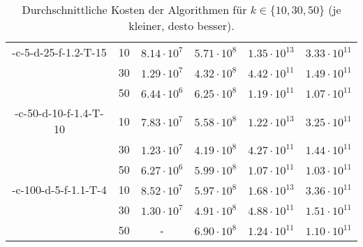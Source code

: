 \begin{table}[h]
\begin{tabular}{@{}cccccc@{}}
	\KCsTwo-c-5-d-25-f-1.2-T-15	& 10 & $8.14 \cdot 10^7$ & $5.71 \cdot 10^8$ & $1.35 \cdot 10^{13}$ & $3.33 \cdot 10^{11}$ \\
			 					& 30 & $1.29 \cdot 10^7$ & $4.32 \cdot 10^8$ & $4.42 \cdot 10^{11}$ & $1.49 \cdot 10^{11}$ \\
		 						& 50 & $6.44 \cdot 10^6$ & $6.25 \cdot 10^8$ & $1.19 \cdot 10^{11}$ & $1.07 \cdot 10^{11}$ \\
	\midrule
	\KCsTwo-c-50-d-10-f-1.4-T-10& 10 & $7.83 \cdot 10^7$ & $5.58 \cdot 10^8$ & $1.22 \cdot 10^{13}$ & $3.25 \cdot 10^{11}$ \\
			 					& 30 & $1.23 \cdot 10^7$ & $4.19 \cdot 10^8$ & $4.27 \cdot 10^{11}$ & $1.44 \cdot 10^{11}$ \\
		 						& 50 & $6.27 \cdot 10^6$ & $5.99 \cdot 10^8$ & $1.07 \cdot 10^{11}$ & $1.03 \cdot 10^{11}$ \\
	\midrule
	\KCsTwo-c-100-d-5-f-1.1-T-4	& 10 & $8.52 \cdot 10^7$ & $5.97 \cdot 10^8$ & $1.68 \cdot 10^{13}$ & $3.36 \cdot 10^{11}$ \\
			 					& 30 & $1.30 \cdot 10^7$ & $4.91 \cdot 10^8$ & $4.88 \cdot 10^{11}$ & $1.51 \cdot 10^{11}$ \\
		 						& 50 & - 				& $6.90 \cdot 10^8$ & $1.24 \cdot 10^{11}$ & $1.10 \cdot 10^{11}$ \\
	\bottomrule
\end{tabular}
\caption{Durchschnittliche Kosten der Algorithmen für $k \in \{ 10, 30, 50 \}$ (je kleiner, desto besser).}
\label{tbl:experiment-coresets-kernelk-costs}
\end{table}
\newpage
